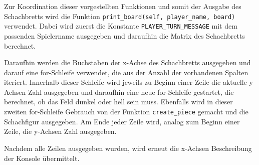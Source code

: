     Zur Koordination dieser vorgestellten Funktionen und somit der Ausgabe
des Schachbretts wird die Funktion
\texttt{print\_board(self,\ player\_name,\ board)} verwendet. Dabei wird
zuerst die Konstante \texttt{PLAYER\_TURN\_MESSAGE} mit dem passenden
Spielername ausgegeben und daraufhin die Matrix des Schachbretts
berechnet.

Daraufhin werden die Buchstaben der x-Achse des Schachbretts ausgegeben
und darauf eine for-Schleife verwendet, die aus der Anzahl der
vorhandenen Spalten iteriert. Innerhalb dieser Schleife wird jeweils zu
Beginn einer Zeile die aktuelle y-Achsen Zahl ausgegeben und daraufhin
eine neue for-Schleife gestartet, die berechnet, ob das Feld dunkel oder
hell sein muss. Ebenfalls wird in dieser zweiten for-Schleife Gebrauch
von der Funktion \texttt{create\_piece} gemacht und die Schachfigur
ausgegeben. Am Ende jeder Zeile wird, analog zum Beginn einer Zeile, die
y-Achsen Zahl ausgegeben.

Nachdem alle Zeilen ausgegeben wurden, wird erneut die x-Achsen
Beschreibung der Konsole übermittelt.

